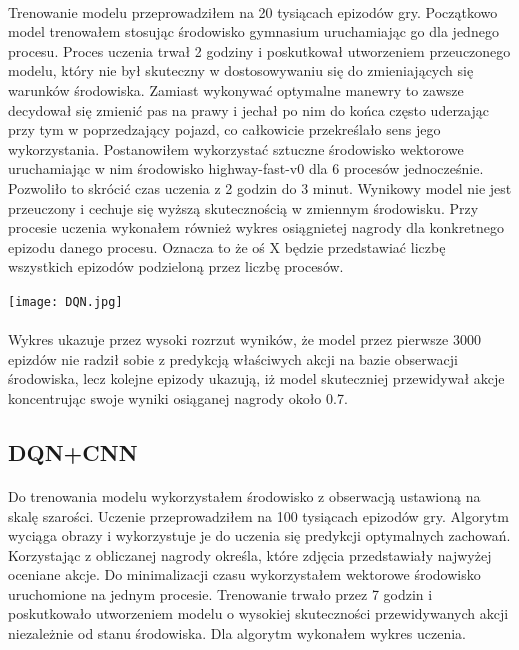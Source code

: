 \documentclass{article}
\begin{document}
\paragraph{}
 Trenowanie modelu przeprowadziłem na 20 tysiącach epizodów gry. Początkowo model trenowałem stosując środowisko gymnasium uruchamiając go dla jednego procesu. Proces uczenia trwał 2 godziny i poskutkował utworzeniem przeuczonego modelu, który nie był skuteczny w dostosowywaniu się do zmieniających się warunków środowiska. Zamiast wykonywać optymalne manewry to zawsze decydował się zmienić pas na prawy i jechał po nim do końca często uderzając przy tym w poprzedzający pojazd, co całkowicie przekreślało sens jego wykorzystania. Postanowiłem wykorzystać sztuczne środowisko wektorowe uruchamiając w nim środowisko highway-fast-v0 dla 6 procesów jednocześnie. Pozwoliło to skrócić czas uczenia z 2 godzin do 3 minut. Wynikowy model nie jest przeuczony i cechuje się wyższą skutecznością w zmiennym środowisku. Przy procesie uczenia wykonałem również wykres osiągnietej nagrody dla konkretnego epizodu danego procesu. Oznacza to że oś X będzie przedstawiać liczbę wszystkich epizodów podzieloną przez liczbę procesów.


\texttt{[image: DQN.jpg]}
\paragraph{}
Wykres ukazuje przez wysoki rozrzut wyników, że model przez pierwsze 3000 epizdów nie radził sobie z predykcją właściwych akcji na bazie obserwacji środowiska, lecz kolejne epizody ukazują, iż model skuteczniej przewidywał akcje koncentrując swoje wyniki osiąganej nagrody około 0.7.

\newpage

\subsection{DQN+CNN}
\paragraph{}
Do trenowania modelu wykorzystałem środowisko z obserwacją ustawioną na skalę szarości. Uczenie przeprowadziłem na 100 tysiącach epizodów gry. Algorytm wyciąga obrazy i wykorzystuje je do uczenia się predykcji optymalnych zachowań. Korzystając z obliczanej nagrody określa, które zdjęcia przedstawiały najwyżej oceniane akcje. Do minimalizacji czasu wykorzystałem wektorowe środowisko uruchomione na jednym procesie. Trenowanie trwało przez 7 godzin i poskutkowało utworzeniem modelu o wysokiej skuteczności przewidywanych akcji niezależnie od stanu środowiska. Dla algorytm wykonałem wykres uczenia.
\end{document}
